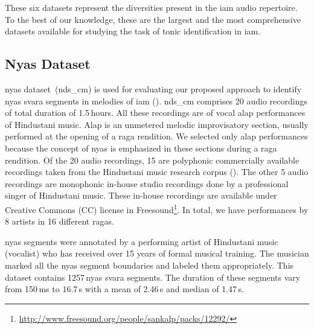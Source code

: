{These six datasets represent the diversities present in the \gls{iam} audio repertoire. To the best of our knowledge, these are the largest and the most comprehensive datasets available for studying the task of tonic identification in \gls{iam}. 


\subsection{Nyas Dataset}
\label{sec:corpus_nyas_dataset}

\Gls{nyas} dataset~(\acrshort{nds_cm}) is used for evaluating our proposed approach to identify \gls{nyas} \gls{svara} segments in melodies of \gls{iam} (). \acrshort{nds_cm} comprises 20 audio recordings of total duration of 1.5\,hours. All these recordings are of vocal \gls{alap} performances of Hindustani music. \gls{Alap} is an unmetered melodic improvisatory section, usually performed at the opening of a \gls{raga} rendition. We selected only \gls{alap} performances because the concept of \gls{nyas} is emphasized in these sections during a \gls{raga} rendition. Of the 20 audio recordings, 15 are polyphonic commercially available recordings taken from the Hindustani music research corpus (). The other 5 audio recordings are monophonic in-house studio recordings done by a professional singer of Hindustani music. These in-house recordings are available under Creative Commons (CC) license in Freesound\footnote{\url{http://www.freesound.org/people/sankalp/packs/12292/}}. In total, we have performances by 8 artists in 16 different \glspl{raga}.%

\Gls{nyas} segments were annotated by a performing artist of Hindustani music (vocalist) who has received over 15 years of formal musical training. The musician marked all the \gls{nyas} segment boundaries and labeled them appropriately. This dataset contains 1257\,\gls{nyas} \gls{svara} segments. The duration of these segments vary from 150\,ms to 16.7\,s with a mean of 2.46\,s and median of 1.47\,s.



}

